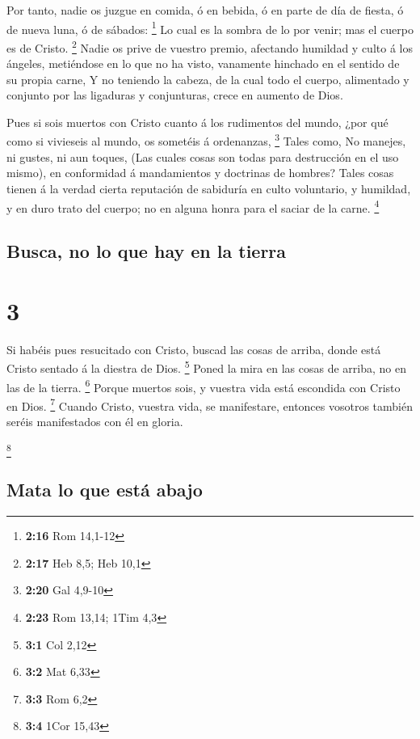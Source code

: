  Por tanto, nadie os juzgue en comida, ó en bebida, ó en
parte de día de fiesta, ó de nueva luna, ó de sábados: \footnote{\textbf{2:16}
  Rom 14,1-12}  Lo cual es la sombra de lo por venir; mas
el cuerpo es de Cristo. \footnote{\textbf{2:17} Heb 8,5; Heb 10,1}
 Nadie os prive de vuestro premio, afectando humildad y
culto á los ángeles, metiéndose en lo que no ha visto, vanamente
hinchado en el sentido de su propia carne,  Y no teniendo
la cabeza, de la cual todo el cuerpo, alimentado y conjunto por las
ligaduras y conjunturas, crece en aumento de Dios.

 Pues si sois muertos con Cristo cuanto á los rudimentos
del mundo, ¿por qué como si vivieseis al mundo, os sometéis á
ordenanzas, \footnote{\textbf{2:20} Gal 4,9-10}  Tales
como, No manejes, ni gustes, ni aun toques,  (Las cuales
cosas son todas para destrucción en el uso mismo), en conformidad á
mandamientos y doctrinas de hombres?  Tales cosas tienen
á la verdad cierta reputación de sabiduría en culto voluntario, y
humildad, y en duro trato del cuerpo; no en alguna honra para el saciar
de la carne. \footnote{\textbf{2:23} Rom 13,14; 1Tim 4,3}

\hypertarget{busca-no-lo-que-hay-en-la-tierra}{%
\subsection{Busca, no lo que hay en la
tierra}\label{busca-no-lo-que-hay-en-la-tierra}}

\hypertarget{section-2}{%
\section{3}\label{section-2}}

 Si habéis pues resucitado con Cristo, buscad las cosas de
arriba, donde está Cristo sentado á la diestra de Dios. \footnote{\textbf{3:1}
  Col 2,12}  Poned la mira en las cosas de arriba, no en
las de la tierra. \footnote{\textbf{3:2} Mat 6,33}  Porque
muertos sois, y vuestra vida está escondida con Cristo en Dios.
\footnote{\textbf{3:3} Rom 6,2}  Cuando Cristo, vuestra
vida, se manifestare, entonces vosotros también seréis manifestados con
él en gloria.

\footnote{\textbf{3:4} 1Cor 15,43}

\hypertarget{mata-lo-que-estuxe1-abajo}{%
\subsection{Mata lo que está abajo}\label{mata-lo-que-estuxe1-abajo}}

